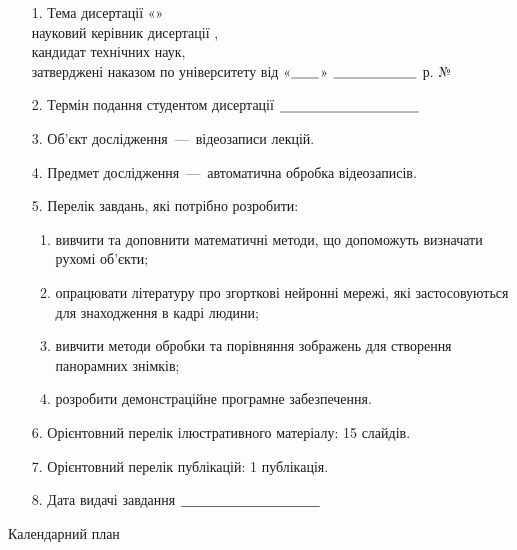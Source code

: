 \begin{enumerate}
    \item[1.]
        Тема дисертації «\theme» \\
        науковий керівник дисертації \mentorName, \\
        кандидат технічних наук, \\
        затверджені наказом по університету від
        «${\text{\underline{\hspace{2em}}}}$»
        ${\text{\underline{\hspace{6em}}}}$  \passYear р. №
    \item[2.]
        Термін подання студентом дисертації ${\text{\underline{\hspace{10em}}}}$
    \item[3.]
        Об’єкт дослідження~---~відеозаписи лекцій.
    \item[4.]
        Предмет дослідження~---~автоматична обробка
        відеозаписів.
    \item[5.]
        Перелік завдань, які потрібно розробити:
        \begin{enumerate}
            \item
                  вивчити та доповнити математичні методи,
                  що допоможуть визначати рухомі об'єкти;
            \item
                  опрацювати літературу про згорткові нейронні мережі, які застосовуються
                  для знаходження в кадрі людини;
            \item
                  вивчити методи обробки та порівняння зображень для створення панорамних знімків;
            \item
                  розробити демонстраційне програмне забезпечення.
        \end{enumerate}
    \item[6.]
        Орієнтовний перелік ілюстративного матеріалу: 15 слайдів.
    \item[7.]
        Орієнтовний перелік публікацій: 1 публікація.
    \item[8.]
        Дата видачі завдання ${\text{\underline{\hspace{10em}}}}$
\end{enumerate}

\begin{center}
    Календарний план
\end{center}

